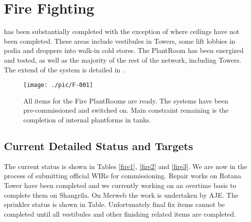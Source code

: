 
\chapter{Fire Fighting}


 has been substantially
completed with the exception of where ceilings have not been completed. These areas include vestibules in Towers, some lift lobbies in podia and droppers into walk-in cold stores. The
PlantRoom has been energized and tested, as well as the majority of the rest of the network, including Towers. The extend of the system is detailed in .

\begin{figure*}
\texttt{[image: ./pic/F-001]}
\caption{All items for the Fire PlantRooms are ready. The systems have been pre-commissioned and
switched on. Main constraint remaining is the completion of internal plantforms in tanks.}
\end{figure*}
 

\section{Current Detailed Status and Targets}

The current status is shown in Tables \ref{fire1}, \ref{fire2} and \ref{fire3}. We are now in the process of submitting official WIRs for commissioning. Repair works on Rotana Tower have been completed and we currently working on an overtime basis to complete them on Shangrila. On Merweb the work is undertaken by AJE. The sprinkler status is shown in Table. Unfortunately final fix items cannot be completed until all vestibules and other finishing related items are completed.

